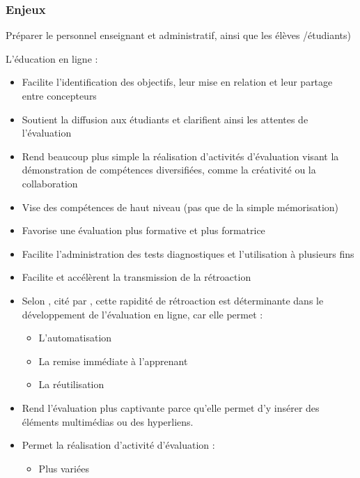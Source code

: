 \documentclass[aspectratio=169]{beamer}
\begin{document}
			\begin{frame}[allowframebreaks]
				  \frametitle{Enjeux}
				
				 
				 \begin{description}
					\item [Les enjeux liés à l'aisance TIC] \par Préparer le personnel enseignant et administratif, ainsi que les élèves /étudiants)\citep{NorthCarolina2013}
					\item[Les enjeux pédagogiques] L'éducation en ligne : 
					 	\begin{itemize}
					 		\item Facilite l'identification des objectifs, leur mise en relation et leur partage entre concepteurs          
							\item Soutient la diffusion aux étudiants et clarifient ainsi les attentes de l'évaluation
							\item Rend beaucoup plus simple la réalisation d'activités d'évaluation visant la démonstration de compétences diversifiées, comme la créativité ou la collaboration
							\item Vise des compétences de haut niveau (pas que de la simple mémorisation)
							\item Favorise une évaluation plus formative et plus formatrice
							\item Facilite l'administration des tests diagnostiques et l'utilisation à plusieurs fins					
							\item Facilite et accélèrent la transmission de la rétroaction
							\item Selon \citet{whitelock2006a}, cité par \citet{audet2011a}, cette rapidité de rétroaction est déterminante dans le développement de l'évaluation en ligne, car elle permet :
					 		\begin {itemize}
									\item L'automatisation
									\item La remise immédiate à l'apprenant
									\item La réutilisation
							\end{itemize}
							\item Rend l'évaluation plus captivante parce qu'elle permet d'y insérer des éléments multimédias ou des hyperliens.
						\item Permet la réalisation d'activité d'évaluation :
								\begin {itemize}
									\item Plus variées

\end{itemize}
\end{itemize}
\end{description}
\end{frame}
\end{document}
